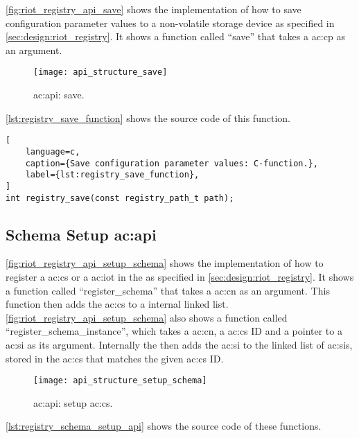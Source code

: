 {\autoref{fig:riot_registry_api_save} shows the implementation of how to save configuration parameter values to a non-volatile storage device as specified in \autoref{sec:design:riot_registry}.
It shows a function called ``save'' that takes a \gls{ac:cp} as an argument.

\begin{figure}[H]
    \centering
    \texttt{[image: api\_structure\_save]}
    \caption{ \gls{ac:api}: save.}
    \label{fig:riot_registry_api_save}
\end{figure}

\autoref{lst:registry_save_function} shows the source code of this function.

\begin{lstlisting}[
    language=c,
    caption={Save configuration parameter values: C-function.},
    label={lst:registry_save_function},
]
int registry_save(const registry_path_t path);
\end{lstlisting}

\subsection{Schema Setup \gls*{ac:api}}

\autoref{fig:riot_registry_api_setup_schema} shows the implementation of how to register a \gls{ac:cs} or a \gls{ac:iot} in the  as specified in \autoref{sec:design:riot_registry}.
It shows a function called ``register\_schema'' that takes a \gls{ac:cn} as an argument.
This function then adds the \gls{ac:cs} to a internal linked list.
\autoref{fig:riot_registry_api_setup_schema} also shows a function called ``register\_schema\_instance'', which takes a \gls{ac:cn}, a \gls{ac:cs} ID and a pointer to a \gls{ac:si} as its argument.
Internally the  then adds the \gls{ac:si} to the linked list of \glspl{ac:si}, stored in the \gls{ac:cs} that matches the given \gls{ac:cs} ID.

\begin{figure}[H]
    \centering
    \texttt{[image: api\_structure\_setup\_schema]}
    \caption{ \gls{ac:api}: setup \gls{ac:cs}.}
    \label{fig:riot_registry_api_setup_schema}
\end{figure}

\autoref{lst:registry_schema_setup_api} shows the source code of these functions.

}
